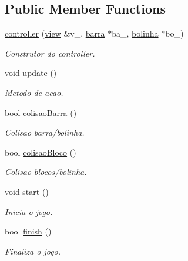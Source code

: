 \subsection*{Public Member Functions}
\begin{DoxyCompactItemize}
\item 
\hyperlink{classcontroller_a5179368251d444a67542bf506ffa6b9c}{controller} (\hyperlink{classview}{view} \&v\+\_\+, \hyperlink{classbarra}{barra} $\ast$ba\+\_\+, \hyperlink{classbolinha}{bolinha} $\ast$bo\+\_\+)
\begin{DoxyCompactList}\small\item\em Construtor do controller. \end{DoxyCompactList}\item 
void \hyperlink{classcontroller_ac0373785a91924ce3d480c1c7dedbd99}{update} ()
\begin{DoxyCompactList}\small\item\em Metodo de acao. \end{DoxyCompactList}\item 
bool \hyperlink{classcontroller_aaaef2bd34f643183bcd6fad64bea1005}{colisao\+Barra} ()
\begin{DoxyCompactList}\small\item\em Colisao barra/bolinha. \end{DoxyCompactList}\item 
bool \hyperlink{classcontroller_ac227dd1b72111d1c6da3362d60aa25d6}{colisao\+Bloco} ()
\begin{DoxyCompactList}\small\item\em Colisao blocos/bolinha. \end{DoxyCompactList}\item 
void \hyperlink{classcontroller_a03872ff488ab704038e14226a8e031ea}{start} ()
\begin{DoxyCompactList}\small\item\em Inicia o jogo. \end{DoxyCompactList}\item 
bool \hyperlink{classcontroller_a993c5fe7272f0435b4018f4b5d1fc1cb}{finish} ()
\begin{DoxyCompactList}\small\item\em Finaliza o jogo. \end{DoxyCompactList}\end{DoxyCompactItemize}
